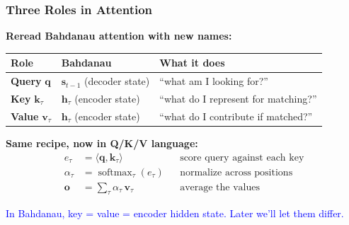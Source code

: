 \documentclass[notes,11pt, aspectratio=169]{beamer}
\DeclareMathOperator{\softmax}{softmax}
\newcommand{\vh}{\mathbf{h}}
\newcommand{\vk}{\mathbf{k}}
\newcommand{\vo}{\mathbf{o}}
\newcommand{\vq}{\mathbf{q}}
\newcommand{\vs}{\mathbf{s}}
\newcommand{\vv}{\mathbf{v}}
\begin{document}
\begin{frame}
\frametitle{Three Roles in Attention}

\textbf{Reread Bahdanau attention with new names:}

\vspace{4pt}
\begin{center}
\renewcommand{\arraystretch}{1.15}
\scriptsize
\begin{tabular}{l l l}
\toprule
\textbf{Role} & \textbf{Bahdanau} & \textbf{What it does} \\
\midrule
\textbf{Query} $\vq$ & $\vs_{t-1}$ (decoder state) & ``what am I looking for?'' \\
\textbf{Key} $\vk_\tau$ & $\vh_\tau$ (encoder state) & ``what do I represent for matching?'' \\
\textbf{Value} $\vv_\tau$ & $\vh_\tau$ (encoder state) & ``what do I contribute if matched?'' \\
\bottomrule
\end{tabular}
\end{center}

\vspace{5pt}
\textbf{Same recipe, now in Q/K/V language:}
\small
\begin{align*}
    e_\tau &= \langle \vq, \vk_\tau \rangle
    &&\text{score query against each key} \\
    \alpha_\tau &= \softmax_\tau(e_\tau)
    &&\text{normalize across positions} \\
    \vo &= \sum_\tau \alpha_\tau\, \vv_\tau
    &&\text{average the values}
\end{align*}
\normalsize

\textcolor{blue}{In Bahdanau, key = value = encoder hidden state. Later we'll let them differ.}
\end{frame}
\end{document}
